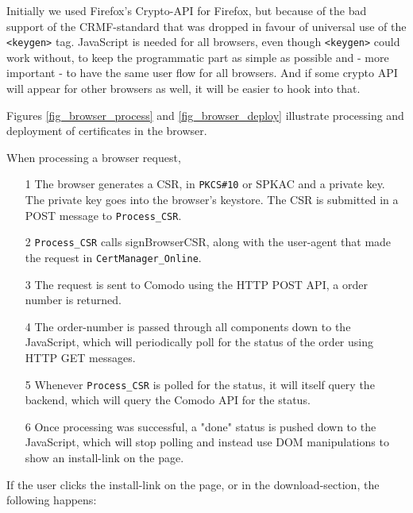 \documentclass{scrartcl}
\begin{document}
Initially we used Firefox's Crypto-API for Firefox, but because of the bad support of the CRMF-standard that was dropped in favour of universal use of the \verb+<keygen>+ tag. JavaScript is needed for all browsers, even though \verb+<keygen>+ could work without, to keep the programmatic part as simple as possible and - more important - to have the same user flow for all browsers. And if some crypto API will appear for other browsers as well, it will be easier to hook into that.

Figures \ref{fig_browser_process} and \ref{fig_browser_deploy} illustrate processing and deployment of certificates in the browser.

When processing a browser request,

\begin{enumerate}
	\item[1] The browser generates a CSR, in \verb+PKCS#10+ or SPKAC and a private key. The private key goes into the browser's keystore. The CSR is submitted in a POST message to \verb+Process_CSR+.
	\item[2] \verb+Process_CSR+ calls signBrowserCSR, along with the user-agent that made the request in \verb+CertManager_Online+.
	\item[3] The request is sent to Comodo using the HTTP POST API, a order number is returned.
	\item[4] The order-number is passed through all components down to the JavaScript, which will periodically poll for the status of the order using HTTP GET messages.
	\item[5] Whenever \verb+Process_CSR+ is polled for the status, it will itself query the backend, which will query the Comodo API for the status.
	\item[6] Once processing was successful, a "done" status is pushed down to the JavaScript, which will stop polling and instead use DOM manipulations to show an install-link on the page.
\end{enumerate}

If the user clicks the install-link on the page, or in the download-section, the following happens:
\end{document}
